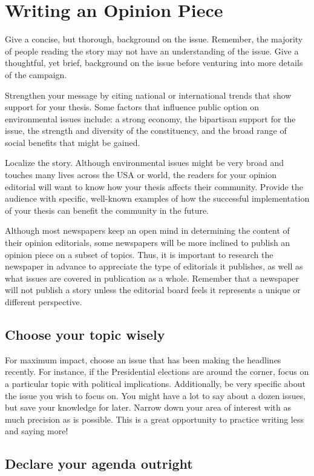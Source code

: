 \documentclass{tufte-handout}\usepackage[]{graphicx}\usepackage[]{color}
\begin{document}
\section{Writing an Opinion Piece}
Give a concise, but thorough, background on the issue. Remember, the majority of people reading the story may not have an understanding of the issue. Give a thoughtful, yet brief, background on the issue before venturing into more details of the campaign.

Strengthen your message by citing national or international trends that show support for your thesis. Some factors  that influence public option on environmental issues include: a strong economy, the bipartisan support for the issue, the strength and diversity of the constituency, and the broad range of social benefits that might be gained.

Localize the story. Although environmental issues might be very broad and touches many lives across the USA or world, the readers for your opinion editorial will want to know how your thesis affects their community. Provide the audience with specific, well-known examples of how the successful implementation of your thesis can benefit the community in the future.

Although most newspapers keep an open mind in determining the content of their opinion editorials, some newspapers will be more inclined to publish an opinion piece on a subset of topics. Thus, it is important to research the newspaper in advance to appreciate the type of editorials it publishes, as well as what issues are covered in publication as a whole. Remember that a newspaper will not publish a story unless the editorial board feels it represents a unique or different perspective.

\subsection{Choose your topic wisely}

For maximum impact, choose an issue that has been making the headlines recently. For instance, if the Presidential elections are around the corner, focus on a particular topic with political implications. Additionally, be very specific about the issue you wish to focus on. You might have a lot to say about a dozen issues, but save your knowledge for later. Narrow down your area of interest with as much precision as is possible. This is a great opportunity to practice writing less and saying more!

\subsection{Declare your agenda outright}
\end{document}
